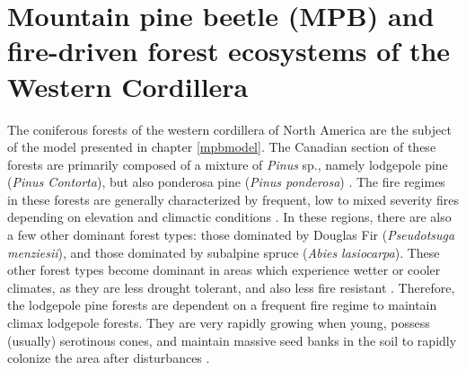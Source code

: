 \section{Mountain pine beetle (MPB) and fire-driven forest ecosystems of the Western Cordillera}


The coniferous forests of the western cordillera of North America are the subject of the model presented in chapter \ref{mpbmodel}. The Canadian section of these forests are primarily composed of a mixture of \textit {Pinus} sp., namely lodgepole pine (\textit{Pinus Contorta}), but also ponderosa pine (\textit{Pinus ponderosa}) \cite{brown2010impact}. The fire regimes in these forests are generally characterized by frequent, low to mixed severity fires depending on elevation and climactic conditions \cite{agee1996fire,arno1980forest}. In these regions, there are also a few other dominant forest types: those dominated by Douglas Fir (\textit{Pseudotsuga menziesii}), and those dominated by subalpine spruce (\textit{Abies lasiocarpa}). These other forest types become dominant in areas which experience wetter or cooler climates, as they are less drought tolerant, and also less fire resistant \cite{JENKINS200816}. Therefore, the lodgepole pine forests are dependent on a frequent fire regime to maintain climax lodgepole forests. They are very rapidly growing when young, possess (usually) serotinous cones, and maintain massive seed banks in the soil to rapidly colonize the area after disturbances \cite{lotan1976cone,lotan1985role}.

